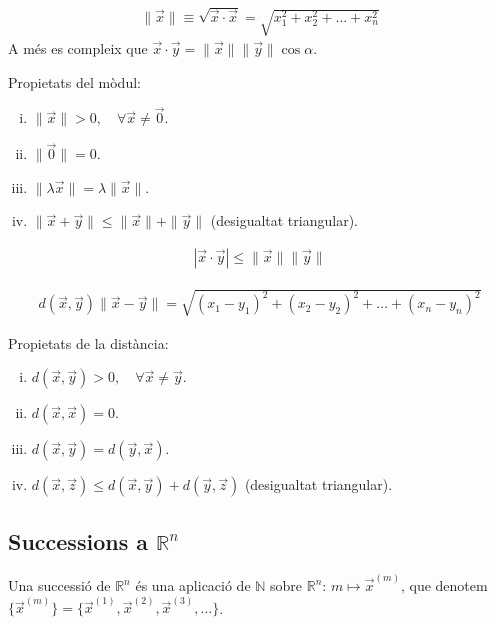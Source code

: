 \begin{defi}
    \begin{align}
        \| \vec{x} \| \equiv \sqrt{\vec{x} \cdot \vec{x}} = \sqrt{x_{1}^{2} + x_{2}^{2} + \dots + x_{n}^{2}}
    \end{align}
    A més es compleix que $\vec{x} \cdot \vec{y} = \| \vec{x} \| \| \vec{y} \| \cos \alpha$.
\end{defi}
Propietats del mòdul:
\begin{enumerate}[i)]
    \item $\| \vec{x} \| > 0, \quad \forall \vec{x} \neq \vec{0}$.
    \item $ \| \vec{0} \| = 0$.
    \item $\| \lambda \vec{x} \| = \lambda \| \vec{x} \|$.
    \item $\|\vec{x} + \vec{y}\| \leq \| \vec{x} \| + \| \vec{y} \|$  (desigualtat triangular).
\end{enumerate}

\begin{defi}
    \begin{align}
        | \vec{x} \cdot \vec{y} | \leq \| \vec{x} \| \| \vec{y} \| 
    \end{align}
\end{defi}

\begin{defi}
    \begin{align}
        d(\vec{x}, \vec{y}) \| \vec{x} - \vec{y} \| = \sqrt{(x_{1} - y_{1})^{2} + (x_{2} - y_{2})^{2} + \dots + (x_{n} - y_{n})^{2}}
    \end{align}
\end{defi}
Propietats de la distància:
\begin{enumerate}[i)]
    \item $d(\vec{x}, \vec{y}) > 0, \quad \forall \vec{x} \neq \vec{y}$.
    \item $d(\vec{x}, \vec{x}) = 0$.
    \item $d(\vec{x}, \vec{y}) = d(\vec{y}, \vec{x})$.
    \item $d(\vec{x}, \vec{z}) \leq d(\vec{x}, \vec{y}) + d(\vec{y}, \vec{z})$  (desigualtat triangular).
\end{enumerate}
\subsection{Successions a $\mathbb{R}^{n}$}
Una successió de $\mathbb{R}^{n}$ és una aplicació de $\mathbb{N}$ sobre $\mathbb{R}^{n}$: $m \mapsto \vec{x}^{(m)}$, que denotem $\{ \vec{x}^{(m)} \} = \{ \vec{x}^{(1)}, \vec{x}^{(2)}, \vec{x}^{(3)}, \dots \}$.


